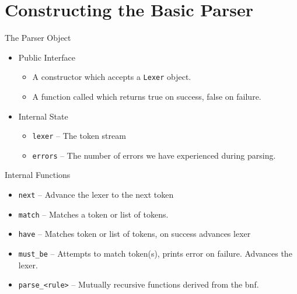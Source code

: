 \documentclass[handout]{beamer}
\newenvironment{code}{%
 \VerbatimEnvironment
 \begin{adjustbox}{max width=\textwidth, max height=0.7\textheight}
 \begin{BVerbatim}
  }{
  \end{BVerbatim}
 \end{adjustbox}
}
\begin{document}

\section{Constructing the Basic Parser}
\begin{frame}{The Parser Object}
    \begin{itemize}
        \item Public Interface
        \begin{itemize}
            \item A constructor which accepts a \texttt{Lexer} object.
            \item A function called  which returns true on success, false on failure.
        \end{itemize}
        \item Internal State
        \begin{itemize}
            \item \texttt{lexer} -- The token stream
            \item \texttt{errors} -- The number of errors we have experienced during parsing.
        \end{itemize}
    \end{itemize}
\end{frame}


\begin{frame}{Internal Functions}
    \begin{itemize}
        \item \texttt{next} -- Advance the lexer to the next token
        \item \texttt{match} -- Matches a token or list of tokens.
        \item \texttt{have} -- Matches token or list of tokens, on success advances lexer
        \item \texttt{must\_be} -- Attempts to match token(s), prints error on failure. Advances the lexer.
        \item \texttt{parse\_<rule>} -- Mutually recursive functions derived from the bnf.
    \end{itemize}
\end{frame}
\end{document}
